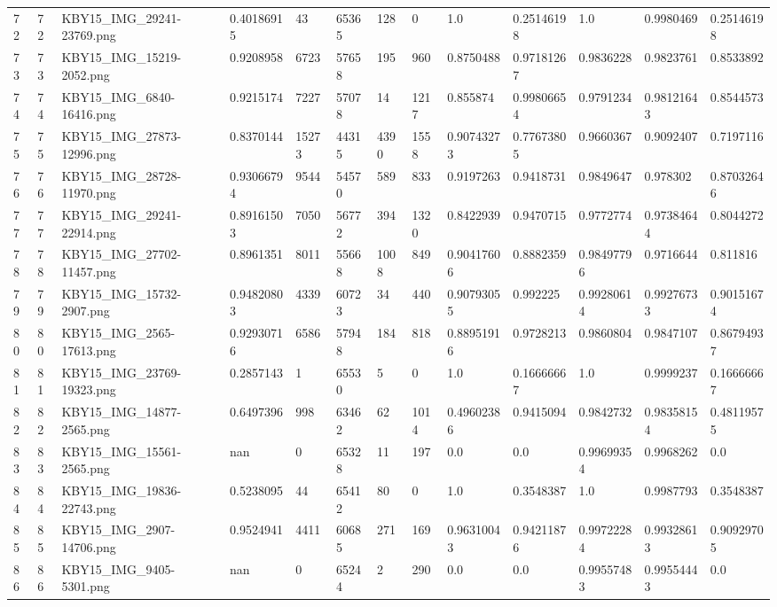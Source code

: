 \documentclass[11pt, a4paper, twoside]{report}
\begin{document}
\begin{longtable}[c]{@{}lllllllllllll@{}}
72 & 72 & KBY15\_IMG\_29241-23769.png & 0.40186915 & 43 & 65365 & 128 & 0 & 1.0 & 0.25146198 & 1.0 & 0.9980469 & 0.25146198 \\
73 & 73 & KBY15\_IMG\_15219-2052.png & 0.9208958 & 6723 & 57658 & 195 & 960 & 0.8750488 & 0.97181267 & 0.9836228 & 0.9823761 & 0.8533892 \\
74 & 74 & KBY15\_IMG\_6840-16416.png & 0.9215174 & 7227 & 57078 & 14 & 1217 & 0.855874 & 0.99806654 & 0.9791234 & 0.98121643 & 0.8544573 \\
75 & 75 & KBY15\_IMG\_27873-12996.png & 0.8370144 & 15273 & 44315 & 4390 & 1558 & 0.90743273 & 0.77673805 & 0.9660367 & 0.9092407 & 0.7197116 \\
76 & 76 & KBY15\_IMG\_28728-11970.png & 0.93066794 & 9544 & 54570 & 589 & 833 & 0.9197263 & 0.9418731 & 0.9849647 & 0.978302 & 0.87032646 \\
77 & 77 & KBY15\_IMG\_29241-22914.png & 0.89161503 & 7050 & 56772 & 394 & 1320 & 0.8422939 & 0.9470715 & 0.9772774 & 0.97384644 & 0.8044272 \\
78 & 78 & KBY15\_IMG\_27702-11457.png & 0.8961351 & 8011 & 55668 & 1008 & 849 & 0.90417606 & 0.8882359 & 0.98497796 & 0.9716644 & 0.811816 \\
79 & 79 & KBY15\_IMG\_15732-2907.png & 0.94820803 & 4339 & 60723 & 34 & 440 & 0.90793055 & 0.992225 & 0.99280614 & 0.99276733 & 0.90151674 \\
80 & 80 & KBY15\_IMG\_2565-17613.png & 0.92930716 & 6586 & 57948 & 184 & 818 & 0.88951916 & 0.9728213 & 0.9860804 & 0.9847107 & 0.86794937 \\
81 & 81 & KBY15\_IMG\_23769-19323.png & 0.2857143 & 1 & 65530 & 5 & 0 & 1.0 & 0.16666667 & 1.0 & 0.9999237 & 0.16666667 \\
82 & 82 & KBY15\_IMG\_14877-2565.png & 0.6497396 & 998 & 63462 & 62 & 1014 & 0.49602386 & 0.9415094 & 0.9842732 & 0.98358154 & 0.48119575 \\
83 & 83 & KBY15\_IMG\_15561-2565.png & nan & 0 & 65328 & 11 & 197 & 0.0 & 0.0 & 0.99699354 & 0.9968262 & 0.0 \\
84 & 84 & KBY15\_IMG\_19836-22743.png & 0.5238095 & 44 & 65412 & 80 & 0 & 1.0 & 0.3548387 & 1.0 & 0.9987793 & 0.3548387 \\
85 & 85 & KBY15\_IMG\_2907-14706.png & 0.9524941 & 4411 & 60685 & 271 & 169 & 0.96310043 & 0.94211876 & 0.99722284 & 0.99328613 & 0.90929705 \\
86 & 86 & KBY15\_IMG\_9405-5301.png & nan & 0 & 65244 & 2 & 290 & 0.0 & 0.0 & 0.99557483 & 0.99554443 & 0.0 \\

\end{longtable}
\end{document}
